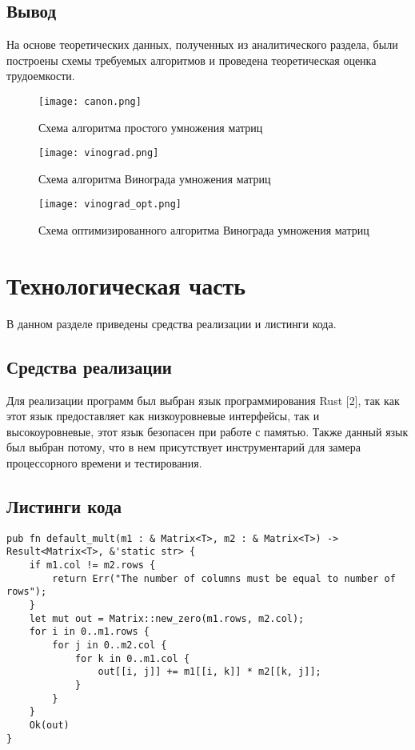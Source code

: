 \subsection{Вывод} 

На основе теоретических данных, полученных из аналитического раздела, были построены схемы требуемых алгоритмов и проведена теоретическая оценка трудоемкости.

\begin{figure}
    \centering
    \texttt{[image: canon.png]}
    \caption{Схема алгоритма простого умножения матриц}
    \label{img:canon}
\end{figure}

\begin{figure}
    \centering
    \texttt{[image: vinograd.png]}
    \caption{Схема алгоритма Винограда умножения матриц}
    \label{img:vinograd}
\end{figure}

\begin{figure}
    \centering
    \texttt{[image: vinograd\_opt.png]}
    \caption{Схема оптимизированного алгоритма Винограда умножения матриц}
    \label{img:vinograd_opt}
\end{figure}

\section{Технологическая часть}

В данном разделе приведены средства реализации и листинги кода.

\subsection{Средства реализации}


Для реализации программ был выбран язык программирования Rust [2], так как этот язык предоставляет как низкоуровневые интерфейсы, так и высокоуровневые, этот язык безопасен при работе с памятью. Также данный язык был выбран потому, что в нем присутствует инструментарий для замера процессорного времени и тестирования.

\subsection{Листинги кода}

\begin{lstlisting}[caption=Алгоритм простого умножения матриц, label=list:canon, language={}]
pub fn default_mult(m1 : & Matrix<T>, m2 : & Matrix<T>) -> Result<Matrix<T>, &'static str> {
    if m1.col != m2.rows {
        return Err("The number of columns must be equal to number of rows");
    }
    let mut out = Matrix::new_zero(m1.rows, m2.col);
    for i in 0..m1.rows {
        for j in 0..m2.col {
            for k in 0..m1.col {
                out[[i, j]] += m1[[i, k]] * m2[[k, j]];
            }
        }
    }
    Ok(out)
}
\end{lstlisting}

